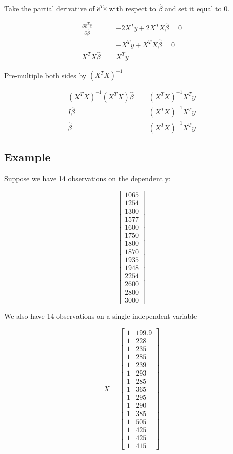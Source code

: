 \documentclass[]{book}
\begin{document}
Take the partial derivative of \(\hat{e}^T\hat{e}\) with respect to \(\hat{\beta}\) and set it equal to 0.

\[\begin{aligned}
\frac{\partial\hat{e}^T\hat{e}}{\partial\hat{\beta}} &= -2X^Ty+2X^TX\hat{\beta}=0\\
&=-X^Ty + X^TX\hat{\beta} = 0 \\
X^TX\hat{\beta} &= X^Ty
\end{aligned}\]

Pre-multiple both sides by \((X^TX)^{-1}\)

\[\begin{aligned}
(X^TX)^{-1}(X^TX)\hat{\beta} &= (X^TX)^{-1}X^Ty \\
I\hat{\beta} &= (X^TX)^{-1}X^Ty \\
\hat{\beta} &= (X^TX)^{-1}X^Ty
\end{aligned}\]

\hypertarget{example}{%
\subsection{Example}\label{example}}

Suppose we have 14 observations on the dependent y:

\[\begin{bmatrix}1065\\ 1254\\ 1300\\1577\\1600\\1750\\1800\\1870\\1935\\1948\\2254\\ 2600\\2800\\3000\end{bmatrix}\]

We also have 14 observations on a single independent variable

\[X = \begin{bmatrix}
1 & 199.9 \\
1 & 228 \\
1 & 235\\
1 & 285\\
1 & 239\\
1 & 293\\
1 & 285\\
1 & 365\\
1 & 295\\
1 & 290\\
1 & 385\\
1 & 505\\
1 & 425\\
1 & 425\\
1 & 415
\end{bmatrix}\]
\end{document}
